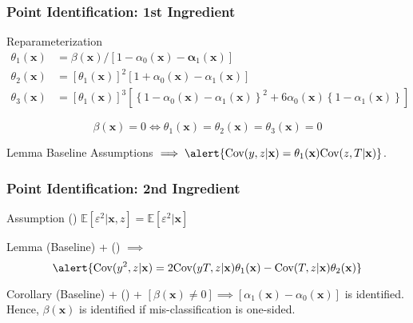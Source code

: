 \documentclass{beamer}
\begin{document}
\begin{frame}
  \frametitle{Point Identification: 1st Ingredient}


  \vspace{-1em}

  \begin{block}{Reparameterization}
    \vspace{-1em}
\begin{align*}
  \theta_1(\mathbf{x}) &= \beta(\mathbf{x})/\left[ 1 - \alpha_0(\mathbf{x}) - \mathbf{\alpha}_1(\mathbf{x})  \right]\\
  \theta_2(\mathbf{x}) &= \left[\theta_1(\mathbf{x})\right]^2 \left[ 1 + \alpha_0(\mathbf{x}) - \alpha_1(\mathbf{x})\right] \\
  \theta_3(\mathbf{x}) &= \left[\theta_1(\mathbf{x})\right]^3\left[ \left\{ 1 - \alpha_0(\mathbf{x}) - \alpha_1(\mathbf{x}) \right\}^2 + 6\alpha_0(\mathbf{x})\left\{ 1 - \alpha_1(\mathbf{x}) \right\} \right]
\end{align*}

\[\boxed{\beta(\mathbf{x}) = 0 \iff \theta_1(\mathbf{x}) = \theta_2(\mathbf{x}) = \theta_3(\mathbf{x}) = 0}\]
  \end{block}

  \vspace{-1.5em}

  \begin{block}{Lemma}
    Baseline Assumptions $\implies \alert{\mbox{Cov}(y,z|\mathbf{x}) = \theta_1(\mathbf{x}) \mbox{Cov}(z,T|\mathbf{x})}$.
  \end{block}

\end{frame}
\begin{frame}
  \frametitle{Point Identification: 2nd Ingredient}

  \begin{block}{Assumption (\spadesuit)}
    $\mathbb{E}[\varepsilon^2|\mathbf{x},z] = \mathbb{E}[\varepsilon^2|\mathbf{x}]$
  \end{block}

  \begin{block}{Lemma}
    (Baseline) + (\spadesuit) $\implies$ 
    \[
      \alert{\mbox{Cov}(y^2,z|\mathbf{x}) = 2\mbox{Cov}(yT,z|\mathbf{x}) \theta_1(\mathbf{x}) -\mbox{Cov}(T,z|\mathbf{x})\theta_2(\mathbf{x})}
    \]
  \end{block}

  \begin{block}{Corollary}
    (Baseline) + (\spadesuit) + $[\beta(\mathbf{x})\neq 0] \implies \left[ \alpha_1(\mathbf{x}) - \alpha_0(\mathbf{x}) \right]$ is identified. Hence, $\beta(\mathbf{x})$ is identified if mis-classification is one-sided.
  \end{block}
    

  
\end{frame}
\end{document}
